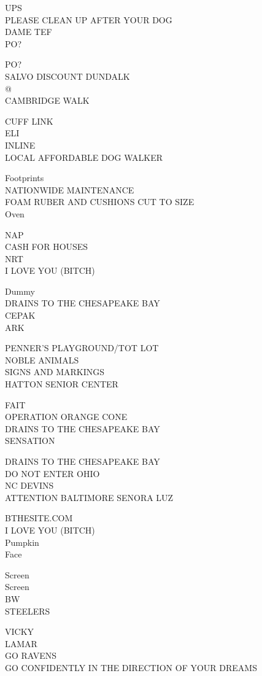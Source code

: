 \documentclass[10pt,letterpaper]{article}
\begin{document}
UPS\\
PLEASE CLEAN UP AFTER YOUR DOG\\
DAME TEF\\
PO?

PO?\\
SALVO DISCOUNT DUNDALK\\
@\\
CAMBRIDGE WALK

CUFF LINK\\
ELI\\
INLINE\\
LOCAL AFFORDABLE DOG WALKER

Footprints\\
NATIONWIDE MAINTENANCE\\
FOAM RUBER AND CUSHIONS CUT TO SIZE\\
Oven

NAP\\
CASH FOR HOUSES\\
NRT\\
I LOVE YOU (BITCH)

Dummy\\
DRAINS TO THE CHESAPEAKE BAY\\
CEPAK\\
ARK

PENNER'S PLAYGROUND/TOT LOT\\
NOBLE ANIMALS\\
SIGNS AND MARKINGS\\
HATTON SENIOR CENTER

FAIT\\
OPERATION ORANGE CONE\\
DRAINS TO THE CHESAPEAKE BAY\\
SENSATION

DRAINS TO THE CHESAPEAKE BAY\\
DO NOT ENTER OHIO\\
NC DEVINS\\
ATTENTION BALTIMORE SENORA LUZ

BTHESITE.COM\\
I LOVE YOU (BITCH)\\
Pumpkin\\
Face

Screen\\
Screen\\
BW\\
STEELERS

VICKY\\
LAMAR\\
GO RAVENS\\
GO CONFIDENTLY IN THE DIRECTION OF YOUR DREAMS
\end{document}
